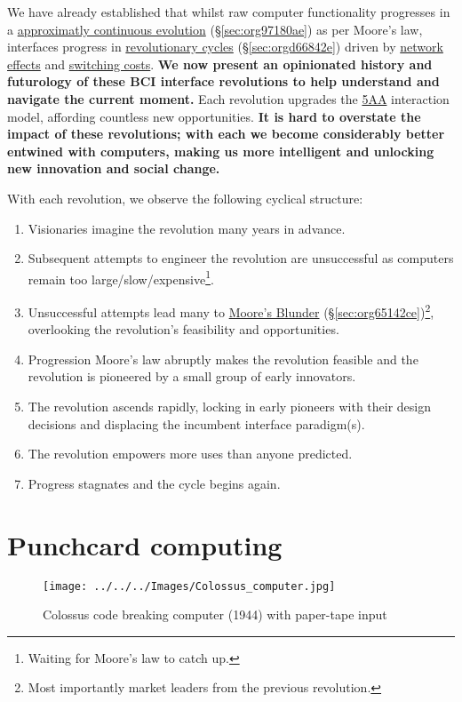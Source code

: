 \documentclass[logo,bsc,singlespacing,parskip]{infthesis}
\begin{document}
We have already established that whilst raw computer functionality progresses in a \hyperref[sec:org97180ae]{approximatly continuous evolution} (\S \ref{sec:org97180ae}) as per Moore's law, interfaces progress in \hyperref[sec:orgd66842e]{revolutionary cycles} (\S \ref{sec:orgd66842e}) driven by \hyperref[network effects]{network effects} and \hyperref[switching costs]{switching costs}.
\textbf{We now present an opinionated history and futurology of these BCI interface revolutions to help understand and navigate the current moment.}
Each revolution upgrades the \hyperref[org2644eb5]{5AA} interaction model, affording countless new opportunities.
\textbf{It is hard to overstate the impact of these revolutions; with each we become considerably better entwined with computers, making us more intelligent and unlocking new innovation and social change.}

With each revolution, we observe the following cyclical structure:

\begin{enumerate}
\item Visionaries imagine the revolution many years in advance.
\item Subsequent attempts to engineer the revolution are unsuccessful as computers remain too large/slow/expensive\footnote{Waiting for Moore's law to catch up.}.
\item Unsuccessful attempts lead many to \hyperref[sec:org65142ce]{Moore's Blunder} (\S \ref{sec:org65142ce})\footnote{Most importantly market leaders from the previous revolution.}, overlooking the revolution's feasibility and opportunities.
\item Progression Moore's law abruptly makes the revolution feasible and the revolution is pioneered by a small group of early innovators.
\item The revolution ascends rapidly, locking in early pioneers with their design decisions and displacing the incumbent interface paradigm(s).
\item The revolution empowers more uses than anyone predicted.
\item Progress stagnates and the cycle begins again.
\end{enumerate}
\section{Punchcard computing}
\label{sec:orgc7c68a4}
\begin{wrapfigure}{r}{0.6\textwidth}
\centering
\texttt{[image: ../../../Images/Colossus\_computer.jpg]}
\caption[Colossus code breaking computer (1944)]{Colossus code breaking computer (1944) with paper-tape input}
\end{wrapfigure}
\end{document}
